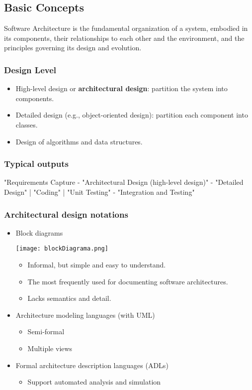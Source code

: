 \documentclass[../ESOF_notes.tex]{subfiles}
\begin{document}
\subsection{Basic Concepts}

Software Architecture is the fundamental organization of a system, embodied in its components, their relationships to each other and the environment, and the principles governing its design and evolution.

\subsubsection{Design Level}
\begin{itemize}
    \item High-level design or \textbf{architectural design}: partition the system into components.
    \item Detailed design (e.g., object-oriented design): partition each component into classes.
    \item Design of algorithms and data structures.
\end{itemize}

\subsubsection{Typical outputs}
"Requirements Capture - "Architectural Design (high-level design)" - "Detailed Design" | "Coding" | "Unit Testing" - "Integration and Testing"

\subsubsection{Architectural design notations}
\begin{itemize}
    \item Block diagrams

          \begin{center}            \texttt{[image: blockDiagrama.png]}
          \end{center}
          \begin{itemize}
              \item Informal, but simple and easy to understand.
              \item The most frequently used for documenting software architectures.
              \item Lacks semantics and detail.
          \end{itemize}

    \item Architecture modeling languages (with UML)
          \begin{itemize}
              \item Semi-formal
              \item Multiple views
          \end{itemize}
    \item Formal architecture description languages (ADLs)
          \begin{itemize}
              \item Support automated analysis and simulation
          \end{itemize}
\end{itemize}
\end{document}
